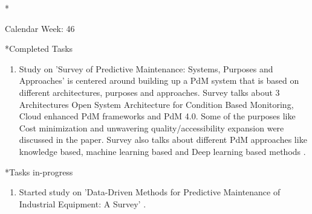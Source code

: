 \documentclass[11pt,a4paper]{article}
\begin{document}
\newpage
\begin{section}*{Calendar Week: 46 \hfill \date{13 November, 2020}}
 \begin{refsection}
     \begin{subsection}*{Completed Tasks}
         \begin{enumerate}
             \item Study on 'Survey of Predictive Maintenance: Systems, Purposes and Approaches' is centered around building up a PdM system that is based on different architectures, purposes and approaches. Survey talks about 3 Architectures Open System Architecture for Condition Based Monitoring, Cloud enhanced PdM frameworks and PdM 4.0. Some of the purposes like Cost minimization and unwavering quality/accessibility expansion were discussed in the paper. Survey also talks about different PdM approaches like knowledge based, machine learning based and Deep learning based methods \cite{DBLP:journals/corr/abs-1912-07383}.
         \end{enumerate}
     \end{subsection}

     \begin{subsection}*{Tasks in-progress}
         \begin{enumerate}
             \item
                   Started study on ’Data-Driven Methods for Predictive Maintenance of Industrial Equipment: A Survey’ \cite{DBLP:journals/sj/ZhangYW19}.
         \end{enumerate}
     \end{subsection}
     \printbibliography
 \end{refsection}
\end{section}
\end{document}
